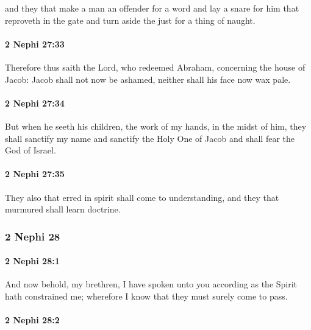 			and they that make a man an offender for a word
			and lay a snare for him that reproveth in the gate
			and turn aside the just for a thing of naught.

		\paragraph{2 Nephi 27:33} %
			\label{2NEPHI-27-33}

			Therefore thus saith the Lord, who redeemed Abraham,
			concerning the house of Jacob:
			Jacob shall not now be ashamed,
			neither shall his face now wax pale.

		\paragraph{2 Nephi 27:34} %
			\label{2NEPHI-27-34}

			But when he seeth his children,
			the work of my hands, in the midst of him,
			they shall sanctify my name and sanctify the Holy One of Jacob
			and shall fear the God of Israel.

		\paragraph{2 Nephi 27:35} %
			\label{2NEPHI-27-35}

			They also that erred in spirit shall come to understanding,
			and they that murmured shall learn doctrine.

	\subsubsection{2 Nephi 28} %
		\label{2NEPHI-28}
		
		\paragraph{2 Nephi 28:1} %
			\label{2NEPHI-28-1}

			And now behold, my brethren, I have spoken unto you
			according as the Spirit hath constrained me;
			wherefore I know that they must surely come to pass.

		\paragraph{2 Nephi 28:2} %
			\label{2NEPHI-28-2}

